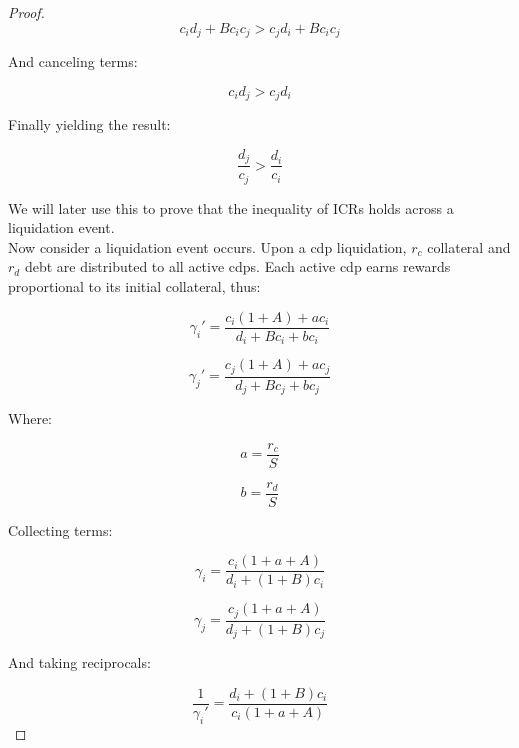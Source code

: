 \documentclass[reqno]{article}
\begin{document}
\begin{proof}
\begin{equation} 
    c_id_j+Bc_ic_j > c_jd_i+Bc_ic_j
\end{equation}

\bigskip
And canceling terms:

\begin{equation}
    c_id_j > c_jd_i
\end{equation}

\bigskip
Finally yielding the result:

\begin{equation} \label{eq:217}
    \frac{d_j}{c_j}>\frac{d_i}{c_i}
\end{equation}

\bigskip
We will later use this to prove that the inequality of ICRs holds across a liquidation event.\\

Now consider a liquidation event occurs. Upon a cdp liquidation, $r_c$ collateral and $r_d$ debt are distributed to all active cdps. Each active cdp earns rewards proportional to its initial collateral, thus:

\begin{equation} 
    \gamma_{i}'=\frac{c_i\left(1+A\right)+ac_i}{d_i+Bc_i+bc_i}
\end{equation}

\begin{equation} 
    \gamma_{j}'=\frac{c_j\left(1+A\right)+ac_j}{d_j+Bc_j+bc_j}
\end{equation}

\bigskip
Where:

\begin{equation} 
    a=\frac{r_c}{S}
\end{equation}

\begin{equation} 
    b=\frac{r_d}{S}
\end{equation}

\bigskip
Collecting terms:

\begin{equation} 
    \gamma_i=\frac{c_i\left(1+a+A\right)}{d_i+\left(1+B\right)c_i}
\end{equation}

\begin{equation} 
    \gamma_j=\frac{c_j\left(1+a+A\right)}{d_j+\left(1+B\right)c_j}
\end{equation}

\bigskip
And taking reciprocals:

\begin{equation} 
    \frac{1}{\gamma_{i}'}=\frac{d_i+\left(1+B\right)c_i}{c_i\left(1+a+A\right)}
\end{equation}


\end{proof}
\end{document}
